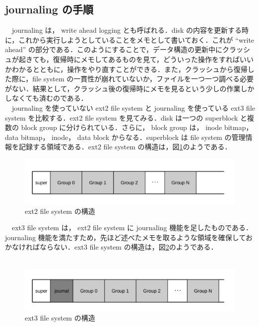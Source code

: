 \documentclass[graduation-thesis]{jsarticle}
\begin{document}
\subsection{journaling の手順}
　journaling は， write ahead logging とも呼ばれる．disk の内容を更新する時に，これから実行しようとしていることをメモとして書いておく．これが ``write ahead'' の部分である．このようにすることで，データ構造の更新中にクラッシュが起きても，復帰時にメモしてあるものを見て，どういった操作をすればいいかわかるとともに，操作をやり直すことができる．また，クラッシュから復帰した際に，file system の一貫性が崩れていないか，ファイルを一つ一つ調べる必要がない．結果として，クラッシュ後の復帰時にメモを見るという少しの作業しかしなくても済むのである．\\
　journaling を使っていない ext2 file system と journaling を使っている ext3 file system を比較する．ext2 file system を見てみる．disk は一つの superblock と複数の block group に分けられている．さらに， block group は， inode bitmap， data bitmap， inode， data block からなる．superblock は file system の管理情報を記録する領域である．ext2 file system の構造は，図\ref{fig:ext2}のようである．\\
\begin{figure}[H]
	\begin{center}
		\includegraphics[width=15.0cm,clip]{images/ext2.pdf}
		\caption{ext2 file system の構造}
		\label{fig:ext2}
	\end{center}
\end{figure}
　ext3 file system は， ext2 file system に journaling 機能を足したものである．journaling 機能を満たすため，先ほど述べたメモを取るような領域を確保しておかなければならない．ext3 file system の構造は，図\ref{fig:ext3}のようである．\\
　\begin{figure}[H]
	\begin{center}
		\includegraphics[width=15.0cm,clip]{images/ext3.pdf}
		\caption{ext3 file system の構造}
		\label{fig:ext3}
	\end{center}
\end{figure}
\end{document}
